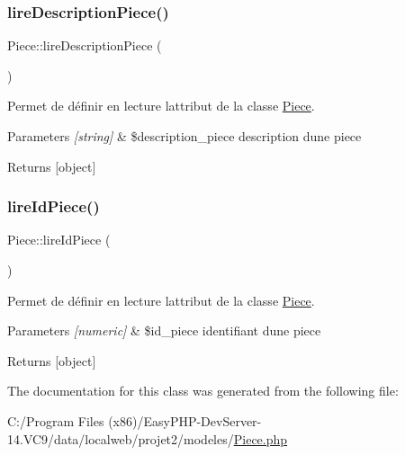 \subsubsection{\texorpdfstring{lire\+Description\+Piece()}{lireDescriptionPiece()}}
{\footnotesize\ttfamily Piece\+::lire\+Description\+Piece (\begin{DoxyParamCaption}{ }\end{DoxyParamCaption})}



Permet de définir en lecture l\textquotesingle{}attribut de la classe \hyperlink{class_piece}{Piece}. 


\begin{DoxyParams}{Parameters}
{\em \mbox{[}string\mbox{]}} & \$description\+\_\+piece description d\textquotesingle{}une piece \\
\hline
\end{DoxyParams}
\begin{DoxyReturn}{Returns}
\mbox{[}object\mbox{]} 
\end{DoxyReturn}
\mbox{\label{class_piece_a2dd6d8c0b86b173535d40603da175418}} 
\subsubsection{\texorpdfstring{lire\+Id\+Piece()}{lireIdPiece()}}
{\footnotesize\ttfamily Piece\+::lire\+Id\+Piece (\begin{DoxyParamCaption}{ }\end{DoxyParamCaption})}



Permet de définir en lecture l\textquotesingle{}attribut de la classe \hyperlink{class_piece}{Piece}. 


\begin{DoxyParams}{Parameters}
{\em \mbox{[}numeric\mbox{]}} & \$id\+\_\+piece identifiant d\textquotesingle{}une piece \\
\hline
\end{DoxyParams}
\begin{DoxyReturn}{Returns}
\mbox{[}object\mbox{]} 
\end{DoxyReturn}


The documentation for this class was generated from the following file\+:\begin{DoxyCompactItemize}
\item 
C\+:/\+Program Files (x86)/\+Easy\+P\+H\+P-\/\+Dev\+Server-\/14.\+V\+C9/data/localweb/projet2/modeles/\hyperlink{_piece_8php}{Piece.\+php}\end{DoxyCompactItemize}
